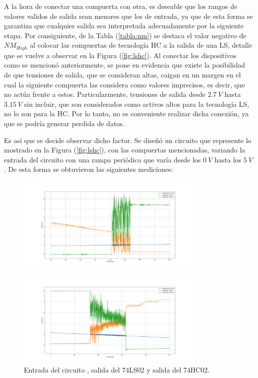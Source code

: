 A la hora de conectar una compuerta con otra, es deseable que los rangos de valores validos de salida sean menores que los de entrada, ya que de esta forma se garantiza que cualquier salida sea interpretada adecuadamente por la siguiente etapa. Por consiguiente, de la Tabla (\ref{tabla:nm}) se destaca el valor negativo de $NM_{High}$ al colocar las compuertas de tecnología HC a la salida de una LS, detalle que se vuelve a observar en la Figura (\ref{fig:lshc}). Al conectar los dispositivos como se mencionó anteriormente, se pone en evidencia que existe la posibilidad de que tensiones de salida, que se consideran altas, caigan en un margen en el cual la siguiente compuerta las considera como valores imprecisos, es decir, que no actúa frente a estos. Particularmente, tensiones de salida desde $2.7 \ V$ hasta $3.15 \ V$ sin incluir, que son considerados como activos altos para la tecnología LS, no lo son para la HC. Por lo tanto, no es conveniente realizar dicha conexión, ya que se podría generar perdida de datos.

Es así que se decide observar dicho factor. Se diseñó un circuito que represente lo mostrado en la Figura (\ref{fig:lshc}), con las compuertas mencionadas, variando la entrada del circuito con una rampa periódica que varía desde los $0 \ V$ hasta los $5 \ V$. De esta forma se obtuvieron las siguientes mediciones:

\begin{figure}[H]
\centering
	\includegraphics[width=0.8\textwidth]{ImagenesEjercicio2/scope_17_1.png}
\end{figure}
\vspace*{-2cm}
\begin{figure}[H]
\centering
	\includegraphics[width=0.8\textwidth]{ImagenesEjercicio2/scope_18_1.png}	
\caption{Entrada del circuito , salida del 74LS02 y salida del 74HC02.}
\label{fig:medicion1}
\end{figure} 

